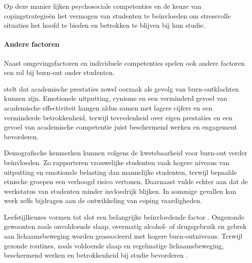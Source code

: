 Op deze manier lijken psychosociale competenties en de keuze van copingstrategieën het vermogen van studenten te beïnvloeden om stressvolle situaties het hoofd te bieden en betrokken te blijven bij hun studie.

\vspace{1em}

\paragraph{Andere factoren}

\vspace{1em}

Naast omgevingsfactoren en individuele competenties spelen ook andere factoren een rol bij burn-out onder studenten.

\vspace{1em}

\textcite{Chong2025} stelt dat academische prestaties zowel oorzaak als gevolg van burn-outklachten kunnen zijn. Emotionele uitputting, cynisme en een verminderd gevoel van academische effectiviteit hangen aldus samen met lagere cijfers en een verminderde betrokkenheid, terwijl tevredenheid over eigen prestaties en een gevoel van academische competentie juist beschermend werken en engagement bevorderen.

\vspace{1em}

Demografische kenmerken kunnen volgens \textcite{Chong2025} de kwetsbaarheid voor burn-out verder beïnvloeden. Zo rapporteren vrouwelijke studenten vaak hogere niveaus van uitputting en emotionele belasting dan mannelijke studenten, terwijl bepaalde etnische groepen een verhoogd risico vertonen. Daarnaast vulde \textcite{Chong2025} echter aan dat de werkstatus van studenten minder invloedrijk blijken. In sommige gevallen kan werk zelfs bijdragen aan de ontwikkeling van coping vaardigheden.

\vspace{1em}

Leefstijlkeuzes vormen tot slot een belangrijke beïnvloedende factor \autocite{Chong2025}. Ongezonde gewoonten zoals onvoldoende slaap, overmatig alcohol- of drugsgebruik en gebrek aan lichaamsbeweging worden geassocieerd met hogere burn-outniveaus. Terwijl gezonde routines, zoals voldoende slaap en regelmatige lichaamsbeweging, beschermend werken en betrokkenheid bij studie bevorderen \autocite{Chong2025}.

\vspace{1em}

